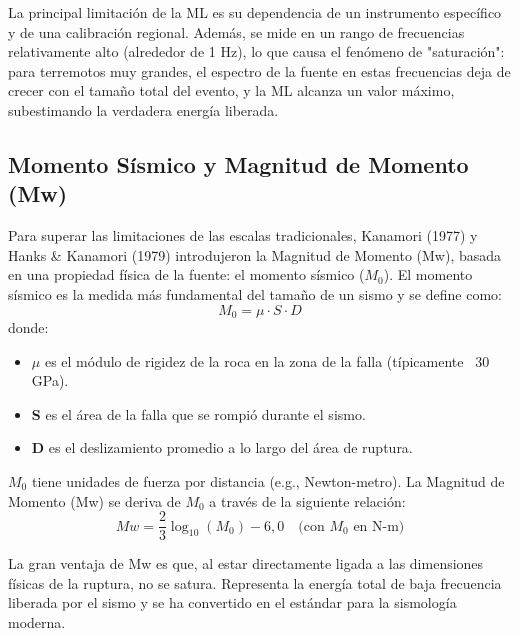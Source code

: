 \documentclass[12pt,a4paper]{article}
\begin{document}
La principal limitación de la ML es su dependencia de un instrumento específico y de una calibración regional. Además, se mide en un rango de frecuencias relativamente alto (alrededor de 1 Hz), lo que causa el fenómeno de "saturación": para terremotos muy grandes, el espectro de la fuente en estas frecuencias deja de crecer con el tamaño total del evento, y la ML alcanza un valor máximo, subestimando la verdadera energía liberada.

\subsection{Momento Sísmico y Magnitud de Momento (Mw)}
Para superar las limitaciones de las escalas tradicionales, Kanamori (1977) y Hanks \& Kanamori (1979) introdujeron la Magnitud de Momento (Mw), basada en una propiedad física de la fuente: el momento sísmico ($M_0$). El momento sísmico es la medida más fundamental del tamaño de un sismo y se define como:
\begin{equation}
M_0 = \mu \cdot S \cdot D
\end{equation}
donde:
\begin{itemize}
    \item $\mu$ es el módulo de rigidez de la roca en la zona de la falla (típicamente ~30 GPa).
    \item \textbf{S} es el área de la falla que se rompió durante el sismo.
    \item \textbf{D} es el deslizamiento promedio a lo largo del área de ruptura.
\end{itemize}

$M_0$ tiene unidades de fuerza por distancia (e.g., Newton-metro). La Magnitud de Momento (Mw) se deriva de $M_0$ a través de la siguiente relación:
\begin{equation}
Mw = \frac{2}{3} \log_{10}(M_0) - 6,0 \quad \text{(con } M_0 \text{ en N-m)}
\end{equation}

La gran ventaja de Mw es que, al estar directamente ligada a las dimensiones físicas de la ruptura, no se satura. Representa la energía total de baja frecuencia liberada por el sismo y se ha convertido en el estándar para la sismología moderna.
\end{document}
